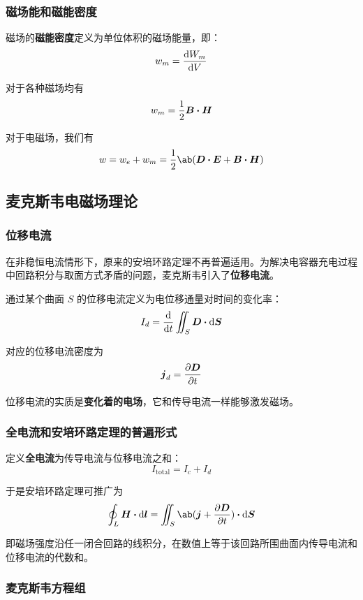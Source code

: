 \subsubsection{磁场能和磁能密度}

\begin{definition}[磁能密度]
	磁场的\textbf{磁能密度}定义为单位体积的磁场能量，即：
	$$
	w_m = \dv{W_m}{V}
	$$
\end{definition}

对于各种磁场均有
$$
w_m = \frac{1}{2} \vect{B} \vdot \vect{H}
$$

对于电磁场，我们有
$$
w = w_e + w_m = \frac{1}{2} \ab(\vect{D} \vdot \vect{E} + \vect{B} \vdot \vect{H})
$$

\subsection{麦克斯韦电磁场理论}

\subsubsection{位移电流}

在非稳恒电流情形下，原来的安培环路定理不再普遍适用。为解决电容器充电过程中回路积分与取面方式矛盾的问题，麦克斯韦引入了\textbf{位移电流}。

\begin{definition}[位移电流]
	通过某个曲面 $S$ 的位移电流定义为电位移通量对时间的变化率：
	$$
	I_d = \dv{t} \iint_S \vect{D} \vdot \dd{\vect{S}}
	$$
\end{definition}

对应的位移电流密度为
$$
\boldsymbol{j}_d = \pdv{\boldsymbol{D}}{t}
$$

位移电流的实质是\textbf{变化着的电场}，它和传导电流一样能够激发磁场。

\subsubsection{全电流和安培环路定理的普遍形式}

定义\textbf{全电流}为传导电流与位移电流之和：
$$
I_{\text{total}} = I_c + I_d
$$

于是安培环路定理可推广为
$$
\oint_L \vect{H} \vdot \dd{\vect{l}} = \iint_S \ab(\vect{j} + \pdv{\vect{D}}{t}) \vdot \dd{\vect{S}}
$$

即磁场强度沿任一闭合回路的线积分，在数值上等于该回路所围曲面内传导电流和位移电流的代数和。

\subsubsection{麦克斯韦方程组}

